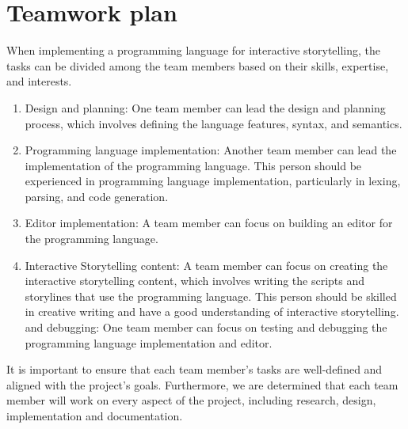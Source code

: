 \section{Teamwork plan}
When implementing a programming language for interactive storytelling, the tasks can be divided among the team members based on their skills, expertise, and interests.
 \begin{enumerate}
                 \item Design and planning: One team member can lead the design and planning process, which involves defining the language features, syntax, and semantics. 
                 \item Programming language implementation: Another team member can lead the implementation of the programming language. This person should be experienced in programming language implementation, particularly in lexing, parsing, and code generation.
                 \item Editor implementation: A team member can focus on building an editor for the programming language.
                 \item Interactive Storytelling content: A team member can focus on creating the interactive storytelling content, which involves writing the scripts and storylines that use the programming language. This person should be skilled in creative writing and have a good understanding of interactive storytelling.
                 \itemTesting and debugging: One team member can focus on testing and debugging the programming language implementation and editor. 
 \end{enumerate}
It is important to ensure that each team member's tasks are well-defined and aligned with the project's goals. Furthermore, we are determined that each team member will work on every aspect of the project, including research, design, implementation and documentation. 


